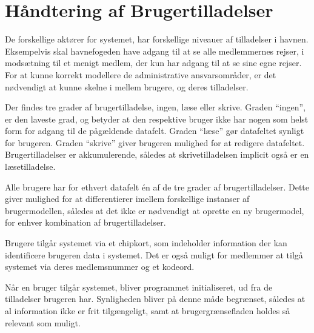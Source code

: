 \section{Håndtering af Brugertilladelser} %
\label{tilladelser}

De forskellige aktører for systemet, har forskellige niveauer af tilladelser i havnen. Eksempelvis skal havnefogeden have adgang til at se alle medlemmernes rejser, i modsætning til et menigt medlem, der kun har adgang til at se sine egne rejser. For at kunne korrekt modellere de administrative ansvarsområder, er det nødvendigt at kunne skelne i mellem brugere, og deres tilladelser.

Der findes tre grader af brugertilladelse, ingen, læse eller skrive. Graden \enquote{ingen}, er den laveste grad, og betyder at den respektive bruger ikke har nogen som helst form for adgang til de pågældende datafelt. Graden \enquote{læse} gør datafeltet synligt for brugeren. Graden \enquote{skrive} giver brugeren mulighed for at redigere datafeltet. Brugertilladelser er akkumulerende, således at skrivetilladelsen implicit også er en læsetilladelse. 

Alle brugere har for ethvert datafelt én af de tre grader af brugertilladelser. Dette giver mulighed for at differentierer imellem forskellige instanser af brugermodellen, således at det ikke er nødvendigt at oprette en ny brugermodel, for enhver kombination af brugertilladelser.

Brugere tilgår systemet via et chipkort, som indeholder information der kan identificere brugeren data i systemet. Det er også muligt for medlemmer at tilgå systemet via deres medlemsnummer og et kodeord.

Når en bruger tilgår systemet, bliver programmet initialiseret, ud fra de tilladelser brugeren har. Synligheden bliver på denne måde begrænset, således at al information ikke er frit tilgængeligt, samt at brugergrænsefladen holdes så relevant som muligt.


